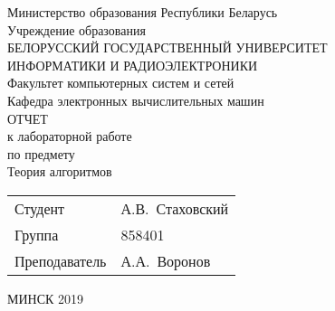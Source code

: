 \begin{titlepage}
  \begin{center}
    Министерство образования Республики Беларусь \\[1em]
    Учреждение образования \\
    БЕЛОРУССКИЙ ГОСУДАРСТВЕННЫЙ УНИВЕРСИТЕТ \\
    ИНФОРМАТИКИ И РАДИОЭЛЕКТРОНИКИ \\[1em]

    Факультет компьютерных систем и сетей \\ [1em]
    Кафедра электронных вычислительных машин \\[8em]

    {ОТЧЕТ}\\
    {к лабораторной работе}\\
    {по предмету}\\
    {Теория алгоритмов}\\[8em]


	  \begin{tabular}{>{\raggedright}p{}p{} }
      Студент & А.В.~Стаховский \\[1em]
      Группа & 858401 \\[1em]
      Преподаватель & А.А.~Воронов \\[1em]
    \end{tabular}

    \vfill
    {\normalsize МИНСК 2019}
  \end{center}
\end{titlepage}

